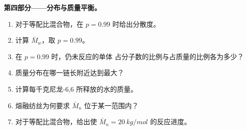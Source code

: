 \begin{problem}
\medskip
\noindent\textbf{第四部分——分布与质量平衡。}
\begin{enumerate}[resume]
  \item 对于等配比混合物，在 $p = 0.99$ 时给出分散度。
  \item 计算 $\bar M_w$，取 $p = 0.99$。
  \item 在 $p = 0.99$ 时，仍未反应的单体
        占分子数的比例与占质量的比例各为多少？
  \item 质量分布在哪一链长附近达到最大？
  \item 计算每千克尼龙-6,6 所释放的水的质量。
  \item 熔融纺丝为何要求 $\bar M_n$ 位于某一范围内？
  \item 对于等配比混合物，给出使 $\bar M_n = \qty{20}{kg/mol}$ 的反应进度。
\end{enumerate}
\end{problem}
